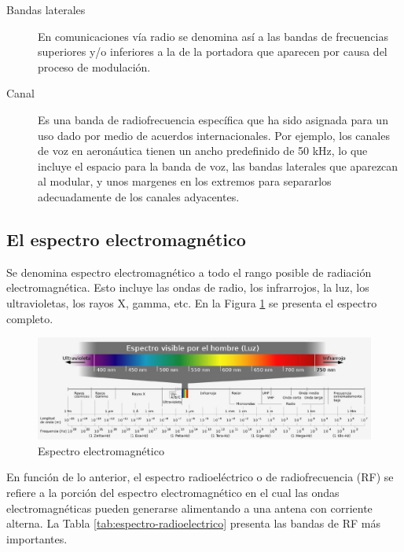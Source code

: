 \begin{description}
\item [Bandas laterales] En comunicaciones v\'ia radio se denomina as\'i a las bandas de frecuencias su\-pe\-rio\-res y/o inferiores a la de la portadora que aparecen por causa del proceso de modulaci\'on.


\item [Canal] Es una banda de radiofrecuencia espec\'ifica que ha sido asignada para un uso dado por medio de acuerdos internacionales. Por ejemplo, los canales de voz en aeron\'autica tienen un ancho predefinido de 50 kHz, lo que incluye el espacio para la banda de voz, las bandas laterales que aparezcan al modular, y unos margenes en los extremos para separarlos adecuadamente de los canales adyacentes.  



\end{description}

\subsection{El espectro electromagn\'etico}

Se denomina espectro electromagn\'etico a todo el rango posible de radiaci\'on electromagn\'etica. Esto incluye las ondas de radio, los infrarrojos, la luz, los ultravioletas, los rayos X, gamma, etc.
  En la Figura \ref{fig:espectro-electromagnetico} se presenta el espectro completo.

\begin{figure}[!h]
  \centering
 \includegraphics[width=\textwidth]{./Imagenes/06.01.adf/electromagneticspectrumes.eps}   
  \caption{Espectro electromagn\'etico}
  \label{fig:espectro-electromagnetico}
\end{figure}

En funci\'on de lo anterior, el espectro radioel\'ectrico o de radiofrecuencia (RF) se refiere a la porci\'on del espectro electromagn\'etico en el cual las ondas electromagn\'eticas pueden generarse alimentando a una antena con corriente alterna. La Tabla \ref{tab:espectro-radioelectrico}   presenta las bandas de RF m\'as importantes. 

